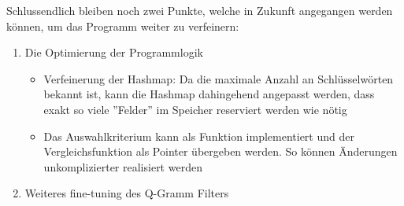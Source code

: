 Schlussendlich bleiben noch zwei Punkte, welche in Zukunft angegangen werden können, um das Programm weiter zu verfeinern:
\begin{enumerate}

\item Die Optimierung der Programmlogik \\
    \begin{itemize}
        \item Verfeinerung der Hashmap: Da die maximale Anzahl an Schlüsselwörten bekannt ist, kann die Hashmap dahingehend angepasst werden, dass exakt so viele ''Felder'' im Speicher reserviert werden wie nötig
        \item Das Auswahlkriterium kann als Funktion implementiert und der Vergleichsfunktion als Pointer übergeben werden. So können Änderungen unkomplizierter realisiert werden
    \end{itemize}


\item Weiteres fine-tuning des Q-Gramm Filters


\end{enumerate}



